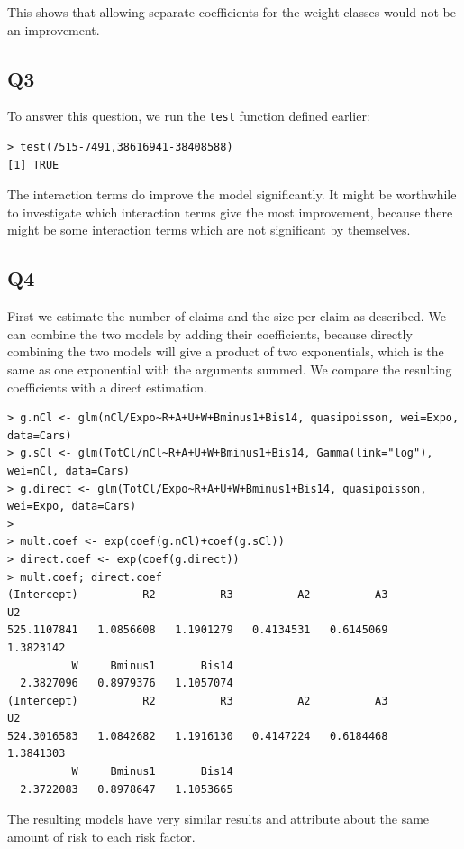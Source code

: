 \documentclass[11pt]{article}
\begin{document}
This shows that allowing separate coefficients for the weight classes would not be an improvement.

\subsection*{Q3}

To answer this question, we run the \verb|test| function defined earlier:

\begin{verbatim}
> test(7515-7491,38616941-38408588)
[1] TRUE
\end{verbatim}

The interaction terms do improve the model significantly. It might be worthwhile to investigate which interaction terms give the most improvement, because there might be some interaction terms which are not significant by themselves.

\subsection*{Q4}

First we estimate the number of claims and the size per claim as described. We can combine the two models by adding their coefficients, because directly combining the two models will give a product of two exponentials, which is the same as one exponential with the arguments summed. We compare the resulting coefficients with a direct estimation.

\begin{verbatim}
> g.nCl <- glm(nCl/Expo~R+A+U+W+Bminus1+Bis14, quasipoisson, wei=Expo, data=Cars)
> g.sCl <- glm(TotCl/nCl~R+A+U+W+Bminus1+Bis14, Gamma(link="log"), wei=nCl, data=Cars)
> g.direct <- glm(TotCl/Expo~R+A+U+W+Bminus1+Bis14, quasipoisson, wei=Expo, data=Cars)
> 
> mult.coef <- exp(coef(g.nCl)+coef(g.sCl))
> direct.coef <- exp(coef(g.direct))
> mult.coef; direct.coef
(Intercept)          R2          R3          A2          A3          U2 
525.1107841   1.0856608   1.1901279   0.4134531   0.6145069   1.3823142 
          W     Bminus1       Bis14 
  2.3827096   0.8979376   1.1057074 
(Intercept)          R2          R3          A2          A3          U2 
524.3016583   1.0842682   1.1916130   0.4147224   0.6184468   1.3841303 
          W     Bminus1       Bis14 
  2.3722083   0.8978647   1.1053665 
\end{verbatim}

The resulting models have very similar results and attribute about the same amount of risk to each risk factor.
\end{document}
